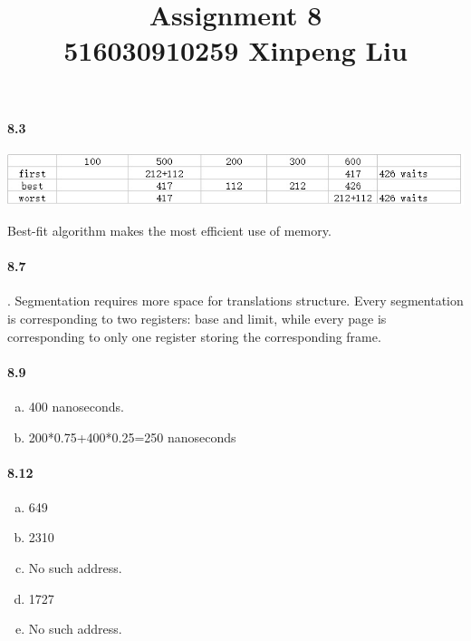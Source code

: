 \documentclass[12pt,a4]{article}
\date{}
\title{
	Assignment 8\\
	\vspace{3mm}
	{\normalsize 516030910259 \textbf{Xinpeng Liu}}
}
\begin{document}
	\maketitle
	\paragraph{8.3}
	\begin{center}
	\includegraphics[width=\textwidth]{1.jpg}
	\end{center}
	Best-fit algorithm makes the most efficient use of memory.
	\paragraph{8.7}.
	Segmentation requires more space for translations structure. Every segmentation is corresponding to two registers: base and limit, while every page is corresponding to only one register storing the corresponding frame. 
	\paragraph{8.9}
	\begin{enumerate}[a.]
		\item 400 nanoseconds.
		\item 200*0.75+400*0.25=250 nanoseconds
	\end{enumerate}
	\paragraph{8.12}
	\begin{enumerate}[a.]
		\item 649
		\item 2310
		\item No such address.
		\item 1727
		\item No such address.
	\end{enumerate}
\end{document}
